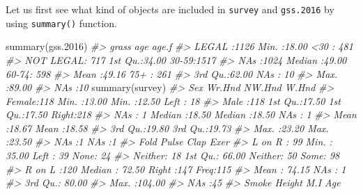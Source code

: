 \documentclass[
]{book}
\newenvironment{Shaded}{\begin{snugshade}}{\end{snugshade}}
\newcommand{\CommentTok}[1]{\textcolor[rgb]{0.56,0.35,0.01}{\textit{#1}}}
\newcommand{\FloatTok}[1]{\textcolor[rgb]{0.00,0.00,0.81}{#1}}
\newcommand{\FunctionTok}[1]{\textcolor[rgb]{0.00,0.00,0.00}{#1}}
\newcommand{\NormalTok}[1]{#1}
\begin{document}
Let us first see what kind of objects are included in \texttt{survey} and \texttt{gss.2016} by using \texttt{summary()} function.

\begin{Shaded}
\begin{Highlighting}[]
\FunctionTok{summary}\NormalTok{(gss}\FloatTok{.2016}\NormalTok{)}
\CommentTok{\#\textgreater{}        grass           age          age.f     }
\CommentTok{\#\textgreater{}  LEGAL    :1126   Min.   :18.00   \textless{}30  : 481  }
\CommentTok{\#\textgreater{}  NOT LEGAL: 717   1st Qu.:34.00   30{-}59:1517  }
\CommentTok{\#\textgreater{}  NA\textquotesingle{}s     :1024   Median :49.00   60{-}74: 598  }
\CommentTok{\#\textgreater{}                   Mean   :49.16   75+  : 261  }
\CommentTok{\#\textgreater{}                   3rd Qu.:62.00   NA\textquotesingle{}s :  10  }
\CommentTok{\#\textgreater{}                   Max.   :89.00               }
\CommentTok{\#\textgreater{}                   NA\textquotesingle{}s   :10}
\FunctionTok{summary}\NormalTok{(survey)}
\CommentTok{\#\textgreater{}      Sex          Wr.Hnd          NW.Hnd        W.Hnd    }
\CommentTok{\#\textgreater{}  Female:118   Min.   :13.00   Min.   :12.50   Left : 18  }
\CommentTok{\#\textgreater{}  Male  :118   1st Qu.:17.50   1st Qu.:17.50   Right:218  }
\CommentTok{\#\textgreater{}  NA\textquotesingle{}s  :  1   Median :18.50   Median :18.50   NA\textquotesingle{}s :  1  }
\CommentTok{\#\textgreater{}               Mean   :18.67   Mean   :18.58              }
\CommentTok{\#\textgreater{}               3rd Qu.:19.80   3rd Qu.:19.73              }
\CommentTok{\#\textgreater{}               Max.   :23.20   Max.   :23.50              }
\CommentTok{\#\textgreater{}               NA\textquotesingle{}s   :1       NA\textquotesingle{}s   :1                  }
\CommentTok{\#\textgreater{}       Fold         Pulse             Clap       Exer    }
\CommentTok{\#\textgreater{}  L on R : 99   Min.   : 35.00   Left   : 39   None: 24  }
\CommentTok{\#\textgreater{}  Neither: 18   1st Qu.: 66.00   Neither: 50   Some: 98  }
\CommentTok{\#\textgreater{}  R on L :120   Median : 72.50   Right  :147   Freq:115  }
\CommentTok{\#\textgreater{}                Mean   : 74.15   NA\textquotesingle{}s   :  1             }
\CommentTok{\#\textgreater{}                3rd Qu.: 80.00                           }
\CommentTok{\#\textgreater{}                Max.   :104.00                           }
\CommentTok{\#\textgreater{}                NA\textquotesingle{}s   :45                               }
\CommentTok{\#\textgreater{}    Smoke         Height            M.I           Age       }

\end{Highlighting}
\end{Shaded}
\end{document}
